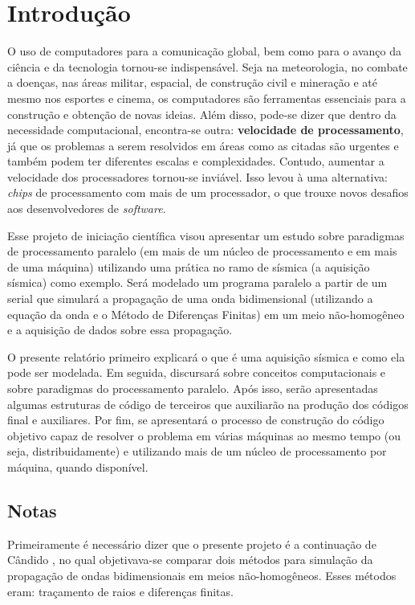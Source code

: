 \chapter{Introdução}

\label{chp1:introduction}
O uso de computadores para a comunicação global, bem como para o avanço da ciência e da tecnologia tornou-se indispensável. Seja na meteorologia, no combate a doenças, nas áreas militar, espacial, de construção civil e mineração e até mesmo nos esportes e cinema, os computadores são ferramentas essenciais para a construção e obtenção de novas ideias. Além disso, pode-se dizer que dentro da necessidade computacional, encontra-se outra: \textbf{velocidade de processamento}, já que os problemas a serem resolvidos em áreas como as citadas são urgentes e também podem ter diferentes escalas e complexidades. Contudo, aumentar a velocidade dos processadores tornou-se inviável. Isso levou à uma alternativa: \textit{chips} de processamento com mais de um processador, o que trouxe novos desafios aos desenvolvedores de \textit{software}.

Esse projeto de iniciação científica visou apresentar um estudo sobre paradigmas de processamento paralelo (em mais de um núcleo de processamento e em mais de uma máquina) utilizando uma prática no ramo de sísmica (a aquisição sísmica) como exemplo. Será modelado um programa paralelo a partir de um serial que simulará a propagação de uma onda bidimensional (utilizando a equação da onda e o Método de Diferenças Finitas) em um meio não-homogêneo e a aquisição de dados sobre essa propagação.

O presente relatório primeiro explicará o que é uma aquisição sísmica e como ela pode ser modelada. Em seguida, discursará sobre conceitos computacionais e sobre paradigmas do processamento paralelo. Após isso, serão apresentadas algumas estruturas de código de terceiros que auxiliarão na produção dos códigos final e auxiliares. Por fim, se apresentará o processo de construção do código objetivo capaz de resolver o problema em várias máquinas ao mesmo tempo (ou seja, distribuidamente) e utilizando mais de um núcleo de processamento por máquina, quando disponível.

\section{Notas}
Primeiramente é necessário dizer que o presente projeto é a continuação de Cândido \cite{mfcandido2018}, no qual objetivava-se comparar dois métodos para simulação da propagação de ondas bidimensionais em meios não-homogêneos. Esses métodos eram: traçamento de raios e diferenças finitas.

